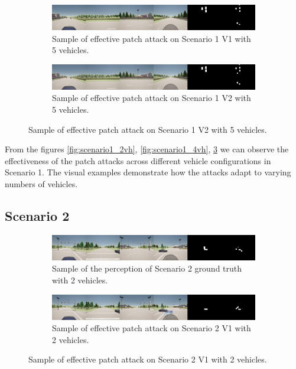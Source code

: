 \begin{figure}[H]
    \centering
    \begin{subfigure}[b]{1\textwidth}
        \centering
        \includegraphics[width=\textwidth]{figures/results/scenario1v15vh.jpg}
        \caption{Sample of effective patch attack on Scenario 1 V1 with 5 vehicles.}
        \label{fig:scenario1_5vh}
    \end{subfigure}
    \vspace{0.5cm}
    \begin{subfigure}[b]{1\textwidth}
        \centering
        \includegraphics[width=\textwidth]{figures/results/scenario1v25vh.jpg}
        \caption{Sample of effective patch attack on Scenario 1 V2 with 5 vehicles.}
        \label{fig:scenario1_5vh}
    \end{subfigure}
\end{figure}

From the figures \ref{fig:scenario1_2vh}, \ref{fig:scenario1_4vh}, \ref{fig:scenario1_5vh} we can observe the effectiveness of the patch attacks across different vehicle configurations in Scenario 1. 
The visual examples demonstrate how the attacks adapt to varying numbers of vehicles.

\subsection{Scenario 2}

\begin{figure}[H]
    \centering
    \begin{subfigure}[b]{1\textwidth}
        \centering
        \includegraphics[width=\textwidth]{figures/results/scenario2gt2vh.jpg}
        \caption{Sample of the perception of Scenario 2 ground truth with 2 vehicles.}
        \label{fig:scenario2_gt2vh}
    \end{subfigure}
    \vspace{0.5cm}
    \begin{subfigure}[b]{1\textwidth}
        \centering
        \includegraphics[width=\textwidth]{figures/results/scenario2v12vh.jpg}
        \caption{Sample of effective patch attack on Scenario 2 V1 with 2 vehicles.}
        \label{fig:scenario2_2vh}
    \end{subfigure}
\end{figure}

